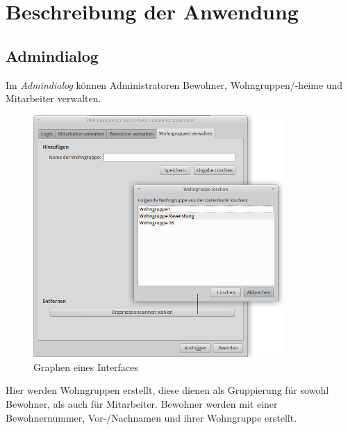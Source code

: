 \section{Beschreibung der Anwendung}
\label{sec:beschreibung}
\subsection{Admindialog}
Im \textit{Admindialog} können Administratoren Bewohner, Wohngruppen/-heime und Mitarbeiter verwalten.
\begin{figure}[h]
	\begin{center}
		\includegraphics[keepaspectratio=true, width=0.85\textwidth]{pics/admin3.png}
		\caption{Graphen eines Interfaces}
		\label{Admindialog_Mitarbeiter_erstellen}
	\end{center}
\end{figure}
\FloatBarrier
\noindent
Hier werden Wohngruppen erstellt, diese dienen als Gruppierung für sowohl Bewohner, als auch für Mitarbeiter.
\newpage
\noindent
Bewohner werden mit einer Bewohnernummer, Vor-/Nachnamen und ihrer Wohngruppe  erstellt. 
